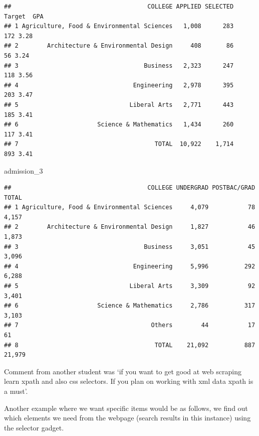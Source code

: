 \documentclass[]{book}
\newenvironment{Shaded}{\begin{snugshade}}{\end{snugshade}}
\newcommand{\DecValTok}[1]{\textcolor[rgb]{0.00,0.00,0.81}{#1}}
\newcommand{\NormalTok}[1]{#1}
\theoremstyle{definition}
\theoremstyle{definition}
\theoremstyle{definition}
\theoremstyle{remark}
\begin{document}
\begin{verbatim}
##                                      COLLEGE APPLIED SELECTED Target  GPA
## 1 Agriculture, Food & Environmental Sciences   1,008      283    172 3.28
## 2        Architecture & Environmental Design     408       86     56 3.24
## 3                                   Business   2,323      247    118 3.56
## 4                                Engineering   2,978      395    203 3.47
## 5                               Liberal Arts   2,771      443    185 3.41
## 6                      Science & Mathematics   1,434      260    117 3.41
## 7                                      TOTAL  10,922    1,714    893 3.41
\end{verbatim}

\begin{Shaded}
\begin{Highlighting}[]
\NormalTok{admission_}\DecValTok{3}
\end{Highlighting}
\end{Shaded}

\begin{verbatim}
##                                      COLLEGE UNDERGRAD POSTBAC/GRAD  TOTAL
## 1 Agriculture, Food & Environmental Sciences     4,079           78  4,157
## 2        Architecture & Environmental Design     1,827           46  1,873
## 3                                   Business     3,051           45  3,096
## 4                                Engineering     5,996          292  6,288
## 5                               Liberal Arts     3,309           92  3,401
## 6                      Science & Mathematics     2,786          317  3,103
## 7                                     Others        44           17     61
## 8                                      TOTAL    21,092          887 21,979
\end{verbatim}

Comment from another student was `if you want to get good at web
scraping learn xpath and also css selectors. If you plan on working with
xml data xpath is a must'.

Another example where we want specific items would be as follows, we
find out which elements we need from the webpage (search results in this
instance) using the selector gadget.
\end{document}
